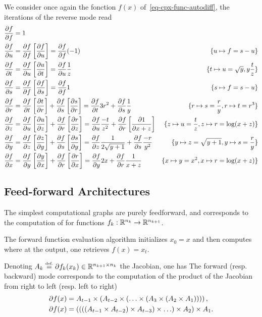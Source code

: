 We consider once again the fonction $f(x)$ of~\eqref{eq-cpx-func-autodiff}, the iterations of the reverse mode read
\begin{align*}
		\pd{f}{f} &= 1 &\\
		\pd{f}{u} &= \pd{f}{f} \pdb{f}{u} 
			= \pd{f}{f} (-1) &
			\{u \mapsto f = s-u\}\\
		\pd{f}{t} &= \pd{f}{u} \pdb{u}{t} 
			= \pd{f}{u} \frac{1}{z}  & 
			\{ t \mapsto u= \sqrt{y}, y \frac{t}{z} \} \\
		\pd{f}{s} &= \pd{f}{f} \pdb{f}{s} = \pd{f}{f} 1 & 
			\{ s \mapsto f = s-u \} \\
		\pd{f}{r} &= \pd{f}{t} \pdb{t}{r} + \pd{f}{s} \pdb{s}{r} 
			= \pd{f}{t} 3r^2 + \pd{f}{s} \frac{1}{y} & 
			\{ r \mapsto s = \frac{r}{y}, r \mapsto  t=r^3\}  \\
		\pd{f}{z} &= \pd{f}{u} \pdb{u}{z} + \pd{f}{r} \pdb{r}{z} 
			= \pd{f}{u} \frac{-t}{z^2} + \pd{f}{r} \pdb{1}{x+z} &
			\{ z \mapsto u=\frac{t}{z}, z \mapsto r=\log(x+z)\} \\
		\pd{f}{y} &= \pd{f}{z}\pdb{z}{y} + \pd{f}{s}\pdb{s}{y}
			= \pd{f}{z} \frac{1}{2\sqrt{y+1}} + \pd{f}{s}\frac{-r}{y^2} &
			\{ y \mapsto z=\sqrt{y+1}, y \mapsto s = \frac{r}{y}\} \\
		\pd{f}{x} &= \pd{f}{y}\pdb{y}{x} + \pd{f}{r}\pdb{r}{x}
			= \pd{f}{y} 2x + \pd{f}{r} \frac{1}{x+z}  &
			\{x \mapsto y=x^2, x \mapsto r=\log(x+z)\}		
\end{align*}



\subsection{Feed-forward Architectures}

The simplest computational graphs are purely feedforward, and corresponds to the computation of 
for functions $f_k : \RR^{n_k} \rightarrow \RR^{n_{k+1}}$.

The forward function evaluation algorithm initializes $x_0=x$ and then computes
where at the output, one retrieves $f(x) = x_t$.

Denoting $A_k \eqdef \partial f_k(x_k) \in \RR^{n_{k+1} \times n_k}$ the Jacobian, one has
The forward (resp. backward) mode corresponds to the computation of the product of the Jacobian from right to left (resp. left to right) 
\begin{align*}
	\partial f(x) &= A_{t-1} \times \pa{  A_{t-2} \times \pa{ \ldots \times \pa{ A_3 \times \pa{ A_2 \times A_1 } } } }, \\
	\partial f(x) &= \pa{ \pa{ \pa{ \pa{ A_{t-1} \times A_{t-2} }  \times A_{t-3} } \times \ldots } \times A_2 } \times A_1.
\end{align*}


